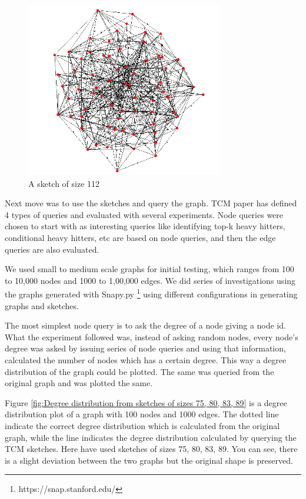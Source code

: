 \documentclass[conference]{IEEEtran}
\begin{document}
\begin{figure}[!t]
\centering
\includegraphics[width=0.6\linewidth]{s3}
\caption{A sketch of size 112}
\label{fig:A sketch of size 112}
\end{figure}

Next move was to use the sketches and query the graph. TCM paper has defined 4 types of queries and evaluated with several experiments. Node queries were chosen to start with as interesting queries like identifying top-k heavy hitters\cite{HeavyHitters}, conditional heavy hitters\cite{TCM}, etc are based on node queries, and then the edge queries are also evaluated.



We used small to medium scale graphs for initial testing, which ranges from 100 to 10,000 nodes and 1000 to 1,00,000 edges.  We did series of investigations using the graphs generated with Snapy.py \footnote{https://snap.stanford.edu/} using different configurations in generating graphs and sketches.


The most simplest node query is to ask the degree of a node giving a node id. What the experiment followed was, instead of asking random nodes, every node’s degree was asked by issuing series of node queries and using that information, calculated the number of nodes which has a certain degree. This way a degree distribution of the graph could be plotted. The same was queried from the original graph and was plotted the same.


Figure \ref{fig:Degree distribution from sketches of sizes 75, 80, 83, 89} is a degree distribution plot of a graph with 100 nodes and 1000 edges. The dotted line indicate the correct degree distribution which is calculated from the original graph, while the line indicates the degree distribution calculated by querying the TCM sketches. Here have used sketches of sizes 75, 80, 83, 89. You can see, there is a slight deviation between the two graphs but the original shape is preserved. 
\end{document}
